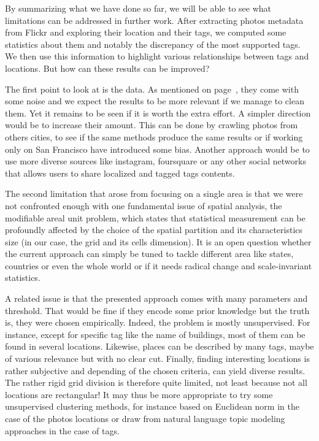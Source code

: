 By summarizing what we have done so far, we will be able to see what
limitations can be addressed in further work. After extracting photos metadata
from Flickr and exploring their location and their tags, we computed some
statistics about them and notably the discrepancy of the most supported tags. We
then use this information to highlight various relationships between tags and
locations. But how can these results can be improved?

The first point to look at is the data. As mentioned on page~\pageref{p:data},
they come with some noise and we expect the results to be more relevant if we
manage to clean them. Yet it remains to be seen if it is worth the extra
effort. A simpler direction would be to increase their amount. This can be
done by crawling photos from others cities, to see if the same methods produce
the same results or if working only on San Francisco have introduced some
bias. Another approach would be to use more diverse sources like instagram,
foursquare or any other social networks that allows users to share localized and
tagged tags contents.

The second limitation that arose from focusing on a single area is that we
were not confronted enough with one fundamental issue of spatial analysis, the
modifiable areal unit problem\cite{scale}, which states that statistical
measurement can be profoundly affected by the choice of the spatial partition
and its characteristics size (in our case, the grid and its cells dimension).
It is an open question whether the current approach can simply be tuned to
tackle different area like states, countries or even the whole world or if it
needs radical change and scale-invariant statistics.

A related issue is that the presented approach comes with many parameters and
threshold. That would be fine if they encode some prior knowledge but the
truth is, they were chosen empirically. Indeed, the problem is mostly
unsupervised. For instance, except for specific tag like the name of
buildings, most of them can be found in several locations. Likewise, places
can be described by many tags, maybe of various relevance but with no clear
cut. Finally, finding interesting locations is rather subjective and
depending of the chosen criteria, can yield diverse results. The rather rigid
grid division is therefore quite limited, not least because not all locations
are rectangular! It may thus be more appropriate to try some unsupervised
clustering methods, for instance based on Euclidean norm in the case of the
photos locations or draw from natural language topic modeling approaches in
the case of tags\cite{topicModel}.

